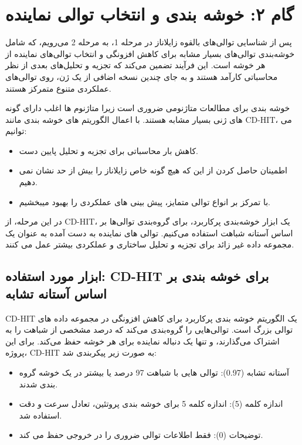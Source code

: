 \chapter{گام ۲: خوشه بندی و انتخاب توالی نماینده}
    پس از شناسایی توالی‌های بالقوه زایلاناز در مرحله 1، به مرحله 2 می‌رویم، که شامل خوشه‌بندی توالی‌های بسیار مشابه برای کاهش افزونگی و انتخاب توالی‌های نماینده از هر خوشه است. این فرآیند تضمین می‌کند که تجزیه و تحلیل‌های بعدی از نظر محاسباتی کارآمد هستند و به جای چندین نسخه اضافی از یک ژن، روی توالی‌های عملکردی متنوع متمرکز هستند.

    خوشه بندی برای مطالعات متاژنومی ضروری است زیرا متاژنوم ها اغلب دارای گونه های ژنی بسیار مشابه هستند. با اعمال الگوریتم های خوشه بندی مانند CD-HIT، می توانیم:
    \begin{itemize}
        \item کاهش بار محاسباتی برای تجزیه و تحلیل پایین دست.
        \item اطمینان حاصل کردن از این که هیچ گونه خاص زایلاناز را بیش از حد نشان نمی دهیم.
        \item با تمرکز بر انواع توالی متمایز، پیش بینی های عملکردی را بهبود میبخشیم.
    \end{itemize}

    در این مرحله، از CD-HIT، یک ابزار خوشه‌بندی پرکاربرد، برای گروه‌بندی توالی‌ها بر اساس آستانه شباهت استفاده می‌کنیم. توالی های نماینده به دست آمده به عنوان یک مجموعه داده غیر زائد برای تجزیه و تحلیل ساختاری و عملکردی بیشتر عمل می کنند.

    \section*{ابزار مورد استفاده: CD-HIT برای خوشه بندی بر اساس آستانه تشابه }
        CD-HIT یک الگوریتم خوشه بندی پرکاربرد برای کاهش افزونگی در مجموعه داده های توالی بزرگ است. توالی‌هایی را گروه‌بندی می‌کند که درصد مشخصی از شباهت را به اشتراک می‌گذارند، و تنها یک دنباله نماینده برای هر خوشه حفظ می‌کند.
        برای این پروژه، CD-HIT به صورت زیر پیکربندی شد:
        \begin{itemize}
            \item آستانه تشابه 
            (0.97): توالی هایی با شباهت 97 درصد یا بیشتر در یک خوشه گروه بندی شدند.
            \item اندازه کلمه (5): اندازه کلمه 5 برای خوشه بندی پروتئین، تعادل سرعت و دقت استفاده شد.
            \item توضیحات (0): فقط اطلاعات توالی ضروری را در خروجی حفظ می کند.
        \end{itemize}
